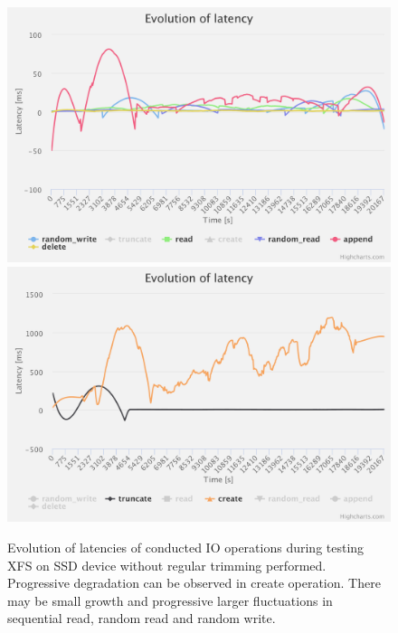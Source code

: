 \documentclass[
  color, %
  table, %
  lof,   %
  lot,   %
]{fithesis3}
\begin{document}
\begin{figure}[!htb]
    \centering
   \begin{minipage}{\textwidth}
        \centering
        \includegraphics[width=\textwidth]{../charts/SSD_xfs_notrim/1}
        \includegraphics[width=\textwidth]{../charts/SSD_xfs_notrim/2}
                \caption[Evolution of latencies of XFS during testing on SSD without regular trimming]{Evolution of latencies of conducted IO operations during testing XFS on SSD device without regular trimming performed. Progressive degradation can be observed in create operation. There may be small growth and progressive larger fluctuations in sequential read, random read and random write.}
\label{fig:lats_xfs_ssd_notrim}
    \end{minipage}
\end{figure}

\clearpage
\end{document}
